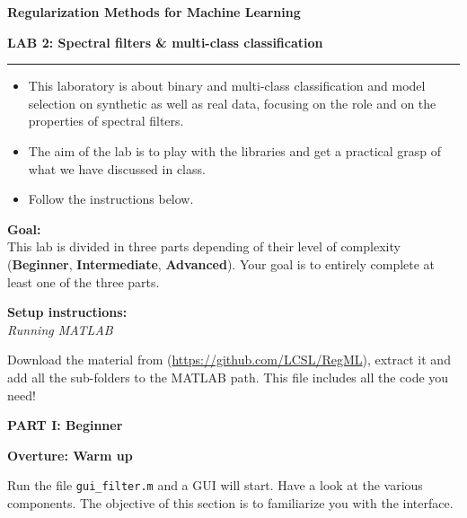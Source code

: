 \documentclass[DIN, pagenumber=false, fontsize=11pt, parskip=half]{scrartcl}
\newcommand{\mytitle}[1]{{\noindent\LARGE\textbf{#1}}}
\newcommand{\mysection}[1]{\noindent\large\textbf{#1}}
\begin{document}
\noindent\textbf{Regularization Methods for Machine Learning}

\mytitle{\center LAB 2: Spectral filters \& multi-class classification}\\
\rule{\textwidth}{1pt}
\begin{itemize}\itemsep1pt \parskip0pt 
  \item This laboratory is about binary and multi-class classification and model selection on synthetic as well as real data, focusing on the role and on the properties of spectral filters.
  \item The aim of the lab is to play with the libraries and get a practical grasp of what we have discussed in class.
  \item Follow the instructions below.  
\end{itemize}

\begin{framed}
\textbf{\textbf{Goal}:} \\
This lab is divided in three parts depending of their level of complexity (\textbf{Beginner}, \textbf{Intermediate}, \textbf{Advanced}). Your goal is to entirely complete at least one of the three parts.
\end{framed}

\begin{framed}
\textbf{\textbf{Setup instructions}:} \\
\textit{Running MATLAB}

 Download the material from (\url{https://github.com/LCSL/RegML}), extract it and add all the sub-folders to the MATLAB path. This file includes all the code you need!
\end{framed}

\pagebreak
\begin{center}
\large\textbf{PART I: Beginner}
\end{center}

\mysection{Overture: Warm up}

\noindent Run the file \texttt{gui\_filter.m} and a GUI will start. Have a look at the various components.
The objective of this section is to familiarize you with the interface.
\end{document}
